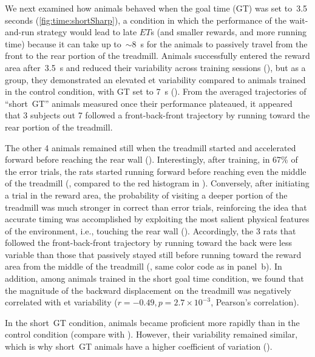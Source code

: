 We next examined how animals behaved when the goal time (GT) was set to~3.5 seconds (\autoref{fig:time:shortSharp}), a condition in which the performance of the wait-and-run strategy would lead to late $ET$s (and smaller rewards, and more running time) because it can take up to~$\sim$8~s for the animals to passively travel from the front to the rear portion of the treadmill.
Animals successfully entered the reward area after~3.5~s and reduced their variability across training sessions (), but as a group, they demonstrated an elevated \gls{et} variability compared to animals trained in the control condition, with GT set to 7~s ().
From the averaged trajectories of ``short~GT'' animals measured once their performance plateaued, it appeared that 3 subjects out 7 followed a front-back-front trajectory by running toward the rear portion of the treadmill.

The other 4 animals remained still when the treadmill started and accelerated forward before reaching the rear wall ().
Interestingly, after training, in 67\% of the error trials, the rats started running forward before reaching even the middle of the treadmill (, compared to the red histogram in ).
Conversely, after initiating a trial in the reward area, the probability of visiting a deeper portion of the treadmill was much stronger in correct than error trials, reinforcing the idea that accurate timing was accomplished by exploiting the most salient physical features of the environment, i.e., touching the rear wall ().
Accordingly, the 3 rats that followed the front-back-front trajectory by running toward the back were less variable than those that passively stayed still before running toward the reward area from the middle of the treadmill (, same color code as in panel~b).
In addition, among animals trained in the short goal time condition, we found that the magnitude of the backward displacement on the treadmill was negatively correlated with \gls{et} variability ($r=-0.49, p=2.7\times 10^{-3}$, Pearson's correlation).
\par
In the short~GT condition, animals became proficient more rapidly than in the control condition (compare  with ).
However, their variability remained similar, which is why short~GT animals have a higher coefficient of variation ().
